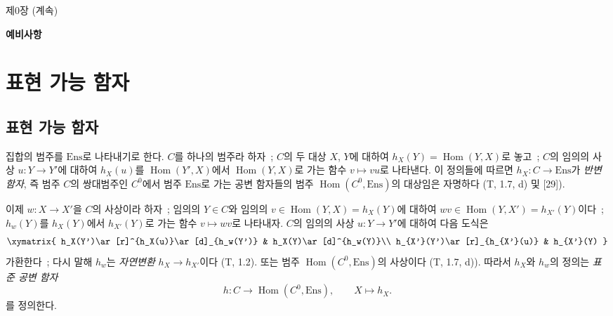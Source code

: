 \clearpage
\thispagestyle{plain}
\label{chapter:0III-fr}

\begin{center}
{\large 제0장 (계속)\footnotemark\par}
\vspace{1.5em}
{\Large\bfseries 예비사항\par}
\end{center}


\setcounter{section}{7}
\section{표현 가능 함자}
\label{section:0.8-fr}

\setcounter{subsection}{0}
\subsection{표현 가능 함자}
\label{subsection:0.8.1-fr}

\begin{env}[8.1.1]
\label{0.8.1.1-fr}
집합의 범주를 $\mathrm{Ens}$로 나타내기로 한다. $C$를 하나의
범주라 하자~; $C$의 두 대상 $X$, $Y$에 대하여
$h_X(Y)=\operatorname{Hom}(Y,X)$로 놓고~; $C$의 임의의 사상
$u:Y\to Y'$에 대하여 $h_X(u)$를 $\operatorname{Hom}(Y',X)$에서
$\operatorname{Hom}(Y,X)$로 가는 함수 $v\mapsto vu$로 나타낸다. 이
정의들에 따르면 $h_X:C\to\mathrm{Ens}$가 \emph{반변 함자}, 즉 범주
$C$의 쌍대범주인 $C^0$에서 범주 $\mathrm{Ens}$로 가는 공변 함자들의
범주 $\operatorname{Hom}(C^0,\mathrm{Ens})$의 대상임은 자명하다
(T, 1.7, d) 및 [29]).
\end{env}

\begin{env}[8.1.2]
\label{0.8.1.2-fr}
이제 $w:X\to X'$을 $C$의 사상이라 하자~; 임의의 $Y\in C$와 임의의
$v\in\operatorname{Hom}(Y,X)=h_X(Y)$에 대하여
$wv\in\operatorname{Hom}(Y,X')=h_{X'}(Y)$이다~; $h_w(Y)$를
$h_X(Y)$에서 $h_{X'}(Y)$로 가는 함수 $v\mapsto wv$로 나타내자.
$C$의 임의의 사상 $u:Y\to Y'$에 대하여 다음 도식은
\[
  \xymatrix{
    h_X(Y')\ar[r]^{h_X(u)}\ar[d]_{h_w(Y')} &
    h_X(Y)\ar[d]^{h_w(Y)}\\
    h_{X'}(Y')\ar[r]_{h_{X'}(u)} &
    h_{X'}(Y)
  }
\]
가환한다~; 다시 말해 $h_w$는 \emph{자연변환}
$h_X\to h_{X'}$이다 (T, 1.2).
또는 범주 $\operatorname{Hom}(C^0,\mathrm{Ens})$의 사상이다
(T, 1.7, d)). 따라서 $h_X$와 $h_w$의 정의는 \emph{표준 공변 함자}
\[
  h:C\to\operatorname{Hom}(C^0,\mathrm{Ens}),\qquad X\mapsto h_X.
  \tag{8.1.2.1}
\]
를 정의한다.
\end{env}

